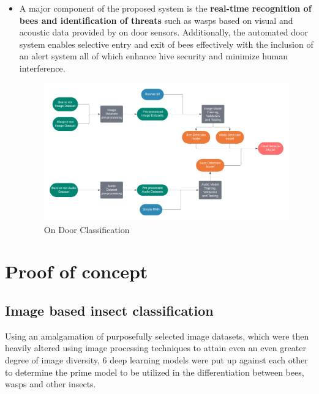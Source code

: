 \documentclass[12pt]{article}
\begin{document}
\begin{itemize}
		\item A major component of the proposed system is the \textbf{real-time recognition of bees and identification of threats} such as wasps based on visual and acoustic data provided by on door sensors. Additionally, the automated door system enables selective entry and exit of bees effectively with the inclusion of an alert system all of which enhance hive security and minimize human interference.
		\begin{figure}[H]
			\centering
			\includegraphics[width=\textwidth]{Images/Pipelines/On Door Classifier Pipeline Diagram.png}
			\caption{On Door Classification}
			\label{fig:DOOR_CLASSIFICATION}
						\vspace{2 cm}
		\end{figure}
	\end{itemize}

	\section{Proof of concept}
	\subsection{Image based insect classification}
	Using an amalgamation of purposefully selected image datasets, which were then heavily altered using image processing techniques to attain even an even greater degree of image diversity, 6 deep learning models were put up against each other to determine the prime model to be utilized in the differentiation between bees, wasps and other insects.
	
\end{document}
